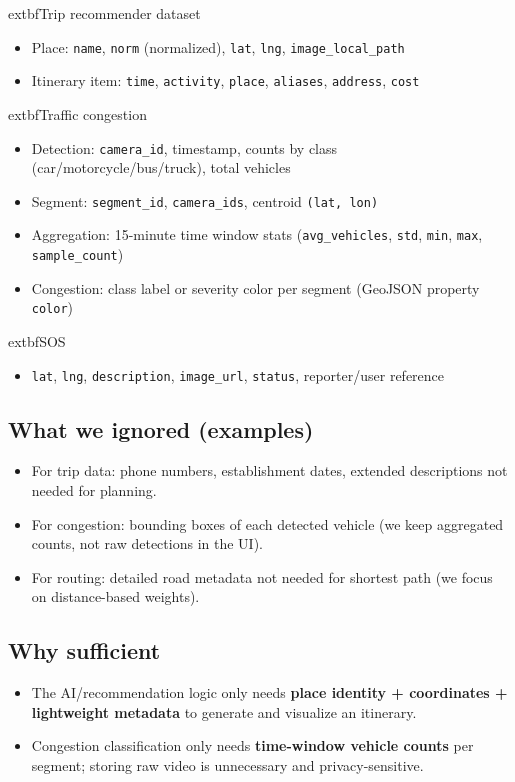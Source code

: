 	extbf{Trip recommender dataset}
\begin{itemize}
  \item Place: \texttt{name}, \texttt{norm} (normalized), \texttt{lat}, \texttt{lng}, \texttt{image\_local\_path}
  \item Itinerary item: \texttt{time}, \texttt{activity}, \texttt{place}, \texttt{aliases}, \texttt{address}, \texttt{cost}
\end{itemize}

	extbf{Traffic congestion}
\begin{itemize}
  \item Detection: \texttt{camera\_id}, timestamp, counts by class (car/motorcycle/bus/truck), total vehicles
  \item Segment: \texttt{segment\_id}, \texttt{camera\_ids}, centroid \texttt{(lat, lon)}
  \item Aggregation: 15-minute time window stats (\texttt{avg\_vehicles}, \texttt{std}, \texttt{min}, \texttt{max}, \texttt{sample\_count})
  \item Congestion: class label or severity color per segment (GeoJSON property \texttt{color})
\end{itemize}

	extbf{SOS}
\begin{itemize}
  \item \texttt{lat}, \texttt{lng}, \texttt{description}, \texttt{image\_url}, \texttt{status}, reporter/user reference
\end{itemize}

\subsection{What we ignored (examples)}
\begin{itemize}
  \item For trip data: phone numbers, establishment dates, extended descriptions not needed for planning.
  \item For congestion: bounding boxes of each detected vehicle (we keep aggregated counts, not raw detections in the UI).
  \item For routing: detailed road metadata not needed for shortest path (we focus on distance-based weights).
\end{itemize}

\subsection{Why sufficient}
\begin{itemize}
  \item The AI/recommendation logic only needs \textbf{place identity + coordinates + lightweight metadata} to generate and visualize an itinerary.
  \item Congestion classification only needs \textbf{time-window vehicle counts} per segment; storing raw video is unnecessary and privacy-sensitive.
\end{itemize}

